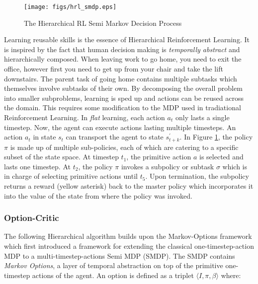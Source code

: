 \documentclass[notitlepage,a4paper,11pt]{article}
\begin{document}
\begin{figure}
	\vspace{-20pt}
	\begin{center}
		\texttt{[image: figs/hrl\_smdp.eps]}
	\end{center}
	\vspace{-20pt}
\caption{The Hierarchical RL Semi Markov Decision Process \protect\cite{ribas2011neural}} \label{fig:hrl_mdp}
\end{figure}

Learning reusable skills is the essence of Hierarchical Reinforcement Learning. It is inspired by the fact that human decision making is \textit{temporally abstract} \cite{sutton1999between} and hierarchically composed. When leaving work to go home, you need to exit the office, however first you need to get up from your chair and take the lift downstairs. The parent task of going home contains multiple subtasks which themselves involve subtasks of their own. By decomposing the overall problem into smaller subproblems, learning is sped up and actions can be reused across the domain. This requires some modification to the MDP used in tradiational Reinforcement Learning. In \textit{flat} learning, each action $a_t$ only lasts a single timestep. Now, the agent can execute actions lasting multiple timesteps. An action $a_t$ in state $s_t$ can transport the agent to state $s^{\prime}_{t+k}$. In Figure \ref{fig:hrl_mdp}, the policy $\pi$ is made up of multiple sub-policies, each of which are catering to a specific subset of the state space. At timestep $t_1$, the primitive action $a$ is selected and lasts one timestep. At $t_2$, the policy $\pi$ invokes a subpolicy or subtask $\sigma$ which is in charge of selecting primitive actions until $t_5$. Upon termination, the subpolicy returns a reward (yellow asterisk) back to the master policy which incorporates it into the value of the state from where the policy was invoked.

\subsubsection{Option-Critic}
The following Hierarchical algorithm builds upon the Markov-Options framework \cite{sutton1999between} which first introduced a framework for extending the classical one-timestep-action MDP to a multi-timestep-actions Semi MDP (SMDP). The SMDP contains \textit{Markov Options}, a layer of temporal abstraction on top of the primitive one-timestep actions of the agent. An option is defined as a triplet $\langle I, \pi, \beta \rangle$ where:
\end{document}

